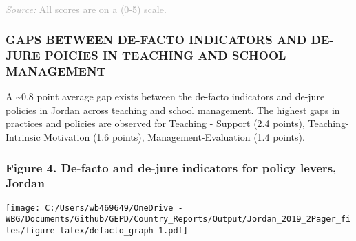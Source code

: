 \documentclass[twocolumn]{article}
\begin{document}
\begin{table}[H]
\\
{\scriptsize
    \textcolor{darkgray}{\textit{Source:} All scores are on a (0-5) scale.}
  }

\end{table}
\raggedbottom

\hypertarget{gaps-between-de-facto-indicators-and-de-jure-poicies-in-teaching-and-school-management}{%
\subsubsection{\texorpdfstring{\textbf{GAPS BETWEEN DE-FACTO INDICATORS
AND DE-JURE POICIES IN TEACHING AND SCHOOL
MANAGEMENT}}{GAPS BETWEEN DE-FACTO INDICATORS AND DE-JURE POICIES IN TEACHING AND SCHOOL MANAGEMENT}}\label{gaps-between-de-facto-indicators-and-de-jure-poicies-in-teaching-and-school-management}}

A \textasciitilde{}0.8 point average gap exists between the de-facto
indicators and de-jure policies in Jordan across teaching and school
management. The highest gaps in practices and policies are observed for
Teaching - Support (2.4 points), Teaching- Intrinsic Motivation (1.6
points), Management-Evaluation (1.4 points).

\hypertarget{figure-4.-de-facto-and-de-jure-indicators-for-policy-levers-jordan}{%
\subsubsection{Figure 4. De-facto and de-jure indicators for policy
levers,
Jordan}\label{figure-4.-de-facto-and-de-jure-indicators-for-policy-levers-jordan}}

\texttt{[image: C:/Users/wb469649/OneDrive - WBG/Documents/Github/GEPD/Country\_Reports/Output/Jordan\_2019\_2Pager\_files/figure-latex/defacto\_graph-1.pdf]}
\end{document}
